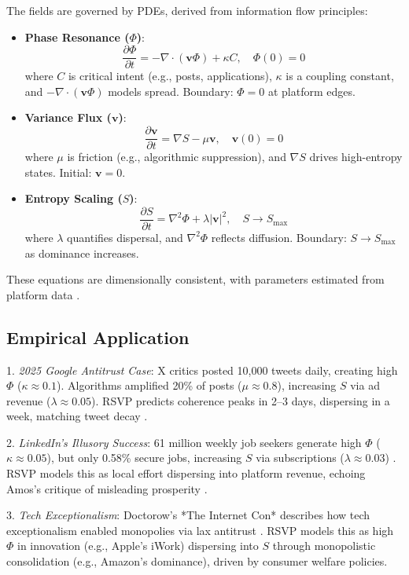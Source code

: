 \documentclass{article}
\begin{document}
The fields are governed by PDEs, derived from information flow principles:

\begin{itemize}
    \item \textbf{Phase Resonance ($\Phi$)}:
    \[
    \frac{\partial \Phi}{\partial t} = -\nabla \cdot (\mathbf{v} \Phi) + \kappa C, \quad \Phi(0) = 0
    \]
    where $C$ is critical intent (e.g., posts, applications), $\kappa$ is a coupling constant, and $-\nabla \cdot (\mathbf{v} \Phi)$ models spread. Boundary: $\Phi = 0$ at platform edges.
    \item \textbf{Variance Flux ($\mathbf{v}$)}:
    \[
    \frac{\partial \mathbf{v}}{\partial t} = \nabla S - \mu \mathbf{v}, \quad \mathbf{v}(0) = 0
    \]
    where $\mu$ is friction (e.g., algorithmic suppression), and $\nabla S$ drives high-entropy states. Initial: $\mathbf{v} = 0$.
    \item \textbf{Entropy Scaling ($S$)}:
    \[
    \frac{\partial S}{\partial t} = \nabla^2 \Phi + \lambda |\mathbf{v}|^2, \quad S \to S_{\text{max}}
    \]
    where $\lambda$ quantifies dispersal, and $\nabla^2 \Phi$ reflects diffusion. Boundary: $S \to S_{\text{max}}$ as dominance increases.
\end{itemize}

These equations are dimensionally consistent, with parameters estimated from platform data \cite{x2025,kinsta2025linkedin}.

\subsection{Empirical Application}

1. \emph{2025 Google Antitrust Case}: X critics posted 10,000 tweets daily, creating high $\Phi$ ($\kappa \approx 0.1$). Algorithms amplified 20\% of posts ($\mu \approx 0.8$), increasing $S$ via ad revenue ($\lambda \approx 0.05$). RSVP predicts coherence peaks in 2--3 days, dispersing in a week, matching tweet decay \cite{x2025,doj2025}.

2. \emph{LinkedIn’s Illusory Success}: 61 million weekly job seekers generate high $\Phi$ ($\kappa \approx 0.05$), but only 0.58\% secure jobs, increasing $S$ via subscriptions ($\lambda \approx 0.03$) \cite{kinsta2025linkedin,ghedau2025linkedin}. RSVP models this as local effort dispersing into platform revenue, echoing Amos’s critique of misleading prosperity \cite{amos2024}.

3. \emph{Tech Exceptionalism}: Doctorow’s *The Internet Con* describes how tech exceptionalism enabled monopolies via lax antitrust \cite{doctorow2023internetcon}. RSVP models this as high $\Phi$ in innovation (e.g., Apple’s iWork) dispersing into $S$ through monopolistic consolidation (e.g., Amazon’s dominance), driven by consumer welfare policies.
\end{document}
